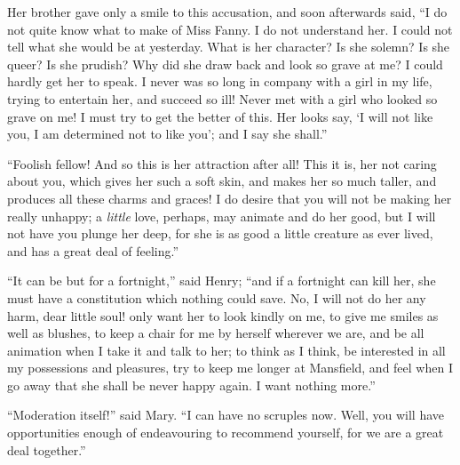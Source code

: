 Her brother gave only a smile to this accusation,
and soon afterwards said, ``I do not quite know what to make
of Miss Fanny.  I do not understand her.  I could not tell
what she would be at yesterday.  What is her character?
Is she solemn?  Is she queer?  Is she prudish?  Why did
she draw back and look so grave at me?  I could hardly get
her to speak.  I never was so long in company with a girl
in my life, trying to entertain her, and succeed so ill!
Never met with a girl who looked so grave on me!
I must try to get the better of this.  Her looks say,
`I will not like you, I am determined not to like you';
and I say she shall.''

``Foolish fellow!  And so this is her attraction after all!
This it is, her not caring about you, which gives
her such a soft skin, and makes her so much taller,
and produces all these charms and graces!  I do desire
that you will not be making her really unhappy;
a \emph{little} love, perhaps, may animate and do her good,
but I will not have you plunge her deep, for she is as
good a little creature as ever lived, and has a great
deal of feeling.''

``It can be but for a fortnight,'' said Henry; ``and if a
fortnight can kill her, she must have a constitution
which nothing could save.  No, I will not do her any harm,
dear little soul! only want her to look kindly on me,
to give me smiles as well as blushes, to keep a chair
for me by herself wherever we are, and be all animation
when I take it and talk to her; to think as I think,
be interested in all my possessions and pleasures,
try to keep me longer at Mansfield, and feel when I
go away that she shall be never happy again.  I want
nothing more.''

``Moderation itself!'' said Mary.  ``I can have no scruples now.
Well, you will have opportunities enough of endeavouring
to recommend yourself, for we are a great deal together.''

